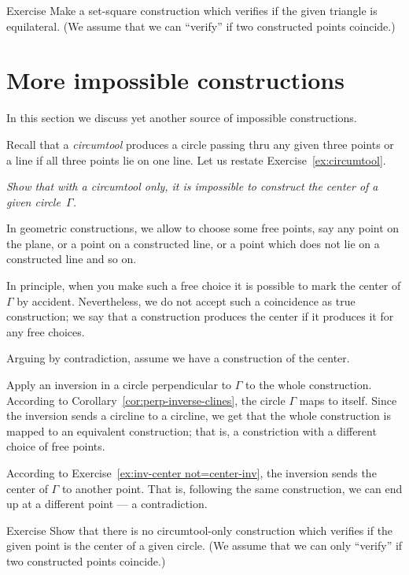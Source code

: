 \begin{thm}{Exercise}\label{ex:equilateral triangle-verify}
Make a set-square construction which verifies if the given triangle is  equilateral.
(We assume that we can ``verify'' if two constructed points coincide.) 
\end{thm}


\section*{More impossible constructions}

In this section we discuss yet another source of impossible constructions. 

Recall that a \emph{circumtool} produces a circle passing thru any given three points
or a line if all three points lie on one line.
Let us restate Exercise~\ref{ex:circumtool}.

\textit{Show that with a circumtool only,
it is impossible to construct the center of a given circle~$\Gamma$.}
\medskip

In geometric constructions, we allow to choose some free points,
say any point on the plane, or a point on a constructed line, or a point which does not lie on a constructed line and so on.

In principle, when you make such a free choice it is possible to mark the center of $\Gamma$ by accident.
Nevertheless, we do not accept such a coincidence as true construction; 
we say that a construction produces the center if it produces it for any free choices.


\label{page:solution-for-ex:circumtool}
Arguing by contradiction, 
assume we have a construction of the center. 

Apply an inversion in a circle perpendicular to $\Gamma$ to the whole construction.
According to Corollary~\ref{cor:perp-inverse-clines},
the circle
$\Gamma$ maps to itself.
Since the inversion sends a circline to a circline, we get that the whole  construction is mapped to an equivalent construction; 
that is, a constriction with a different choice of free points.

According to Exercise~\ref{ex:inv-center not=center-inv}, 
the inversion sends the center of $\Gamma$ to another point.
That is, following the same construction, we can end up at a different point --- a contradiction.
\qeds

\begin{thm}{Exercise}\label{ex:center-verify}
Show that there is no circumtool-only construction which verifies if the given point is the center of a given circle.
(We assume that we can only ``verify'' if two constructed points coincide.) 
\end{thm}

